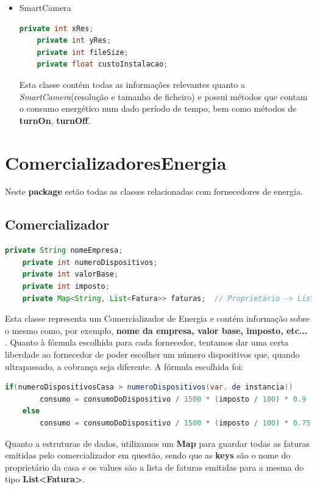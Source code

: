 \documentclass[11pt,a4paper]{report}
\begin{document}
\begin{itemize}
        \item SmartCamera
        \begin{lstlisting}[language=java,firstnumber=1]
    private int xRes;
    private int yRes;
    private int fileSize;
    private float custoInstalacao;
    \end{lstlisting}
    
    Esta classe contém todas as informações relevantes quanto a\textit{ SmartCamera}(resolução e tamanho de ficheiro) e possui métodos que contam o consumo energético num dado período de tempo, bem como métodos de\textbf{ turnOn}, \textbf{turnOff}.
    
        \end{itemize}
        
	\section{ComercializadoresEnergia}
	
	Neste\textbf{ package} estão todas as classes relacionadas com fornecedores de energia.
	
	\subsection{Comercializador}
	\begin{lstlisting}[language=java,firstnumber=1]
    private String nomeEmpresa;
    private int numeroDispositivos;
    private int valorBase;
    private int imposto;
    private Map<String, List<Fatura>> faturas;  // Proprietário -> Lista de Faturas
    \end{lstlisting}
    
    Esta classe representa um Comercializador de Energia e contém informação sobre o mesmo como, por exemplo, \textbf{nome da empresa, valor base, imposto, etc...} .
    Quanto à fórmula escolhida para cada fornecedor, tentamos dar uma certa liberdade ao fornecedor de poder escolher um número dispositivos que, quando ultrapassado, a cobrança seja diferente. A fórmula escolhida foi:
    
    \begin{lstlisting}[language=java,firstnumber=1]
    if(numeroDispositivosCasa > numeroDispositivos(var. de instancia))
        consumo = consumoDoDispositivo / 1500 * (imposto / 100) * 0.9
    else
        consumo = consumoDoDispositivo / 1500 * (imposto / 100) * 0.75
    \end{lstlisting}
    
    Quanto a estruturas de dados, utilizamos um \textbf{Map} para guardar todas as faturas emitidas pelo comercializador em questão, sendo que as \textbf{keys} são o nome do proprietário da casa e os values são a lista de faturas emitidas para a mesma do tipo \textbf{List<Fatura>}.
	
\end{document}
